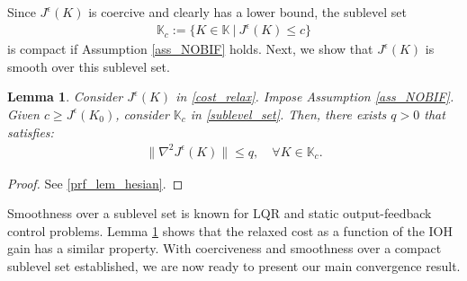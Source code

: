 \documentclass[preprint,5p,times,twocolumn]{elsarticle}
\newcommand{\bm}[1]{{\mbox{\boldmath $#1$}}}
\newtheorem{lem}{Lemma}
\def\rms{{}^{\rm s}\hspace{-0.2mm}}
\def\rmsK{{}^{\rm s}\hspace{-0.4mm}}
\begin{document}
Since $J^{\epsilon}(K)$ is coercive and clearly has a lower bound, the sublevel set
\begin{align}\label{sublevel_set}
    \mathbb{K}_{c} := \{K \in \mathbb{K}~|~ J^{\epsilon}(K) \leq c\}
\end{align} 
is compact if Assumption \ref{ass_NOBIF} holds. Next, we show that $J^{\epsilon}(K)$ is smooth over this sublevel set. 
\begin{lem}\label{lem_hesian}
Consider $J^{\epsilon}(K)$ in \eqref{cost_relax}. Impose Assumption \ref{ass_NOBIF}. Given $c \geq J^{\epsilon}(K_0)$, consider $\mathbb K_c$ in \eqref{sublevel_set}. Then, there exists $q > 0$ that satisfies:  
\begin{align}
    \|\nabla^2 J^{\epsilon}(K)\| \leq q, \quad \forall K \in \mathbb K_{c}. \label{q_def}
\end{align}
\end{lem}
\begin{proof}
See \ref{prf_lem_hesian}. 
\end{proof}

Smoothness over a sublevel set is known for LQR \cite{fazel} and static output-feedback control \cite{duan2023optimization} problems. Lemma \ref{lem_hesian} shows that the relaxed cost as a function of the IOH gain has a similar property. With coerciveness and smoothness over a compact sublevel set established, we are now ready to present our main convergence result.
\end{document}
